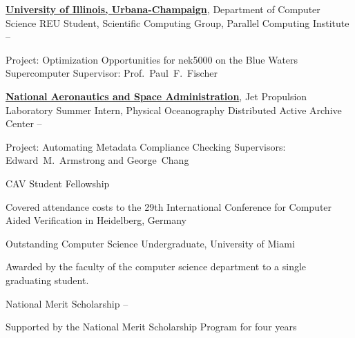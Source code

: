 \documentclass[letterpaper,MMMyyyy,nonstopmode]{simpleresumecv}
\begin{document}
\begin{Body}
\Entry
\href{http://illinois.edu/}{\textbf{University of Illinois, Urbana-Champaign}}, Department of Computer Science
\Gap
\BulletItem REU Student, Scientific Computing Group, Parallel Computing Institute
\hfill {} -- 
\begin{Detail}
\SubBulletItem
Project: Optimization Opportunities for nek5000 on the Blue Waters Supercomputer
\SubBulletItem
Supervisor: Prof.~Paul~F.~Fischer
\end{Detail}

\Entry
\href{http://www.jpl.nasa.gov/}{\textbf{National Aeronautics and Space Administration}},
Jet Propulsion Laboratory
\Gap
\BulletItem Summer Intern, Physical Oceanography Distributed Active Archive Center
\hfill
{} -- 
\begin{Detail}
\SubBulletItem
Project: Automating Metadata Compliance Checking
\SubBulletItem
Supervisors: Edward~M.~Armstrong and George~Chang
\end{Detail}



\nocite{*}

\Gap
{}
\Gap
\printbibliography[heading=none,type=article]

\Gap
{}
\Gap
\printbibliography[heading=none,type=inproceedings]



\Gap
\BulletItem CAV Student Fellowship
\hfill
{}
\begin{Detail}
\Item Covered attendance costs to the 29th International Conference for Computer Aided Verification in Heidelberg, Germany
\end{Detail}

\Gap
\BulletItem Outstanding Computer Science Undergraduate, University of Miami
\hfill
{}
\begin{Detail}
\Item Awarded by the faculty of the computer science department to a single graduating student.
\end{Detail}

\Gap
\BulletItem National Merit Scholarship
\hfill
{} -- 
\begin{Detail}
\Item Supported by the National Merit Scholarship Program for four years
\end{Detail}


\end{Body}
\end{document}
